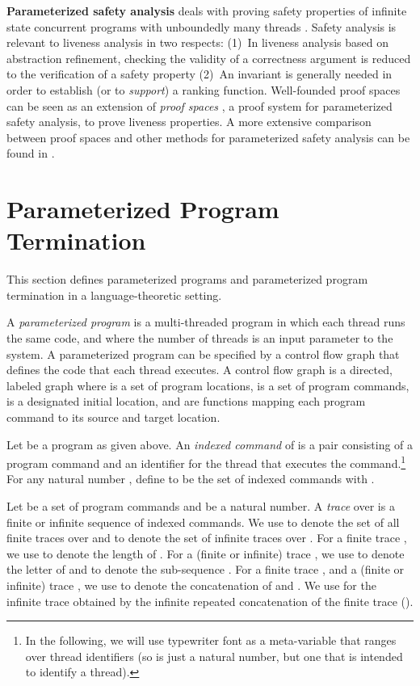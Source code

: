 \documentclass[9pt,nocopyrightspace]{sigplanconf}
\theoremstyle{definition}
\newcommand{\idx}[1]{\text{\rm\texttt{#1}}}
\newcommand{\itrace}{infinite trace}
\begin{document}
\textbf{Parameterized safety analysis} deals with proving safety properties of
infinite state concurrent programs with unboundedly many threads
\cite{Kaiser2014,Sanchez2012,Jaffar2009,Segalov2009}.  Safety analysis is
relevant to liveness analysis in two respects: (1)~In liveness analysis based
on abstraction refinement, checking the validity of a correctness argument is
reduced to the verification of a safety property \cite{Cook2005,pldi/CookPR06}
(2)~An invariant is generally needed in order to establish (or to
\emph{support}) a ranking function.  
Well-founded proof spaces can be seen as an extension of \emph{proof spaces}
\cite{Farzan2015}, a proof system for parameterized safety analysis, to prove
liveness properties.  A more extensive comparison between proof spaces and
other methods for parameterized safety analysis can be found in
\cite{Farzan2015}.



\section{Parameterized Program Termination} \label{sec:prelim}

This section defines parameterized programs and parameterized program
termination in a language-theoretic setting.



A \emph{parameterized program} is a multi-threaded program in which each
thread runs the same code, and where the number of threads is an input
parameter to the system.  A parameterized program can be specified by a
control flow graph that defines the code that each thread
executes.
A control flow graph is a directed, labeled graph  where  is a set of program
locations,  is a set of program commands,  is a designated
initial location, and  are functions
mapping each program command to its source and target location.

Let  be a program as given above. 
An \emph{indexed command}
 of  is a pair
consisting of a program command  and an identifier  for the
thread that executes the command.\footnote{In the following, we will use typewriter font  as a meta-variable that ranges over thread identifiers (so \idx{i} is just a natural number, but one that is intended to identify a thread).}  For any natural number , define
 to be the set of indexed commands  with
.

Let  be a set of program commands and  be a natural
number.  A \emph{trace} over  is a finite or infinite sequence of
indexed commands.  We use  to denote the set of all finite traces over  and 
 to denote the set of infinite traces over .  For a finite trace , we use  to denote the length of
.  For a (finite or infinite) trace , we use 
 to denote the  letter of  and
 to denote the sub-sequence .  For a
finite trace , and a (finite or infinite) trace , we use  to denote the concatenation of  and .
We use
  for the \itrace{} obtained by the infinite repeated
concatenation of the finite trace 
(). 
\end{document}
